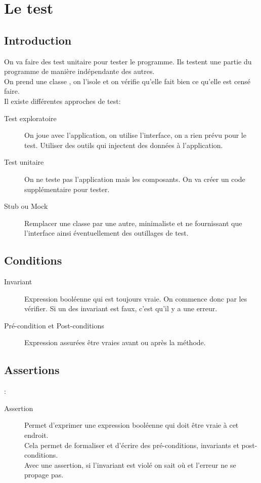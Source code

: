 \section{Le test}


\subsection{Introduction}
On va faire des test unitaire pour tester le programme. Ils testent une partie du programme de manière indépendante des autres.
\\On prend une classe , on l’isole et on vérifie qu’elle fait bien ce qu’elle est censé faire.
\\Il existe différentes approches de test:
\begin{description}
	\item [Test exploratoire] On joue avec l’application, on utilise l’interface, on a rien prévu pour le test. Utiliser des outils qui injectent des données à l’application.
	\item [Test unitaire] On ne teste pas l’application mais les composants. On va créer un code supplémentaire pour tester.
	\item [Stub ou Mock] Remplacer une classe par une autre, minimaliste et ne fournissant que l’interface ainsi éventuellement des outillages de test.
\end{description}


\subsection{Conditions}
\begin{description}
	\item [Invariant] Expression booléenne qui est toujours vraie. On commence donc par les vérifier. Si un des invariant est faux, c’est qu’il y a une erreur.
	\item [Pré-condition et Post-conditions] Expression assurées être vraies avant ou après la méthode.
\end{description}


\subsection{Assertions}:
\begin{description}
	\item [Assertion] Permet d’exprimer une expression booléenne qui doit être vraie à cet endroit.
	\\Cela permet de formaliser et d’écrire des pré-conditions, invariants et post-conditions.
	\\Avec une assertion, si l’invariant est violé on sait où et l’erreur ne se propage pas.
\end{description}


